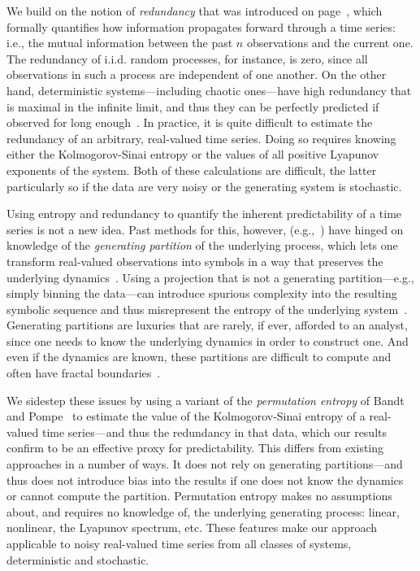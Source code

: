\documentclass[%
pre,
reprint,
superscriptaddress,
showpacs,
nofootinbib,
nobibnotes,
 amsmath,amssymb,
 aps,
]{revtex4-1}
\begin{document}
We build on the notion of \emph{redundancy} that was introduced on
page~\pageref{page:redundancy}, which formally quantifies how
information propagates forward through a time series:
i.e., the mutual information between the past $n$ observations and the
current one.
%
The redundancy of i.i.d. random processes, for instance, is zero,
since all observations in such a process are independent of one
another.  On the other hand, deterministic systems---including chaotic
ones---have high redundancy that is maximal in the infinite limit, and
thus they can be perfectly predicted if observed for long
enough~\cite{weigend93}.  In practice, it is quite difficult to
estimate the redundancy of an arbitrary, real-valued time series.
Doing so requires knowing either the Kolmogorov-Sinai entropy or the
values of all positive Lyapunov exponents of the system.  Both of
these calculations are difficult, the latter particularly so if the
data are very noisy or the generating system is stochastic.

Using entropy and redundancy to quantify the inherent predictability
of a time series is not a new idea.  Past methods for this, however,
(e.g.,~\cite{Shannon1951, mantegna1994linguistic}) have hinged on
knowledge of the \emph{generating partition} of the underlying
process, which lets one transform real-valued observations into
symbols in a way that preserves the underlying dynamics~\cite{lind95}.
Using a projection that is not a generating partition---e.g., simply
binning the data---can introduce spurious complexity into the
resulting symbolic sequence and thus misrepresent the entropy of the
underlying system~\cite{bollt2001}.  Generating partitions are
luxuries that are rarely, if ever, afforded to an analyst, since one
needs to know the underlying dynamics in order to construct one.  And
even if the dynamics are known, these partitions are difficult to
compute and often have fractal boundaries~\cite{eisele1999}.

We sidestep these issues by using a variant of the \emph{permutation
  entropy} of Bandt and Pompe~\cite{bandt2002per} to estimate the
value of the Kolmogorov-Sinai entropy of a real-valued time
series---and thus the redundancy in that data, which our results
confirm to be an effective proxy for predictability.  This differs
from existing approaches in a number of ways.  It does not rely on
generating partitions---and thus does not introduce bias into the
results if one does not know the dynamics or cannot compute the
partition.  Permutation entropy makes no assumptions about, and
requires no knowledge of, the underlying generating process: linear,
nonlinear, the Lyapunov spectrum, etc.  These features make our
approach applicable to noisy real-valued time series from all classes
of systems, deterministic and stochastic.
\end{document}
